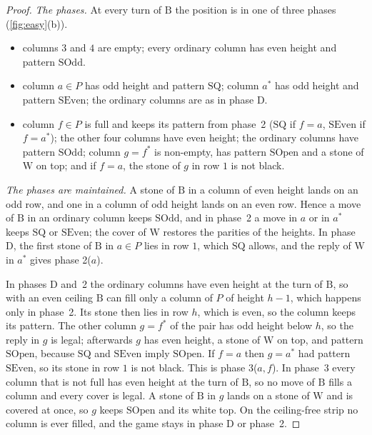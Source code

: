 \documentclass[11pt,a4paper]{article}
\theoremstyle{plain}
\theoremstyle{definition}
\newcommand{\B}{\mathrm{B}}
\newcommand{\W}{\mathrm{W}}
\begin{document}
\begin{proof}
\emph{The phases.} At every turn of $\B$ the position is in one of three phases (\cref{fig:easy}(b)).
\begin{itemize}[leftmargin=4.2em,labelwidth=3.6em,labelsep=0.6em,align=left]
  \item[D:] columns $3$ and $4$ are empty; every ordinary column has even height and pattern $\mathrm{SOdd}$.
  \item[2($a$):] column $a\in P$ has odd height and pattern $\mathrm{SQ}$; column $a^*$ has odd height and pattern $\mathrm{SEven}$; the ordinary columns are as in phase D.
  \item[3($a,f$):] column $f\in P$ is full and keeps its pattern from phase~2 ($\mathrm{SQ}$ if $f=a$, $\mathrm{SEven}$ if $f=a^*$); the other four columns have even height; the ordinary columns have pattern $\mathrm{SOdd}$; column $g=f^*$ is non-empty, has pattern $\mathrm{SOpen}$ and a stone of $\W$ on top; and if $f=a$, the stone of $g$ in row $1$ is not black.
\end{itemize}

\emph{The phases are maintained.} A stone of $\B$ in a column of even height lands on an odd row, and one in a column of odd height lands on an even row. Hence a move of $\B$ in an ordinary column keeps $\mathrm{SOdd}$, and in phase~2 a move in $a$ or in $a^*$ keeps $\mathrm{SQ}$ or $\mathrm{SEven}$; the cover of $\W$ restores the parities of the heights. In phase D, the first stone of $\B$ in $a\in P$ lies in row $1$, which $\mathrm{SQ}$ allows, and the reply of $\W$ in $a^*$ gives phase 2($a$).

In phases D and~2 the ordinary columns have even height at the turn of $\B$, so with an even ceiling $\B$ can fill only a column of $P$ of height $h-1$, which happens only in phase~2. Its stone then lies in row $h$, which is even, so the column keeps its pattern. The other column $g=f^*$ of the pair has odd height below $h$, so the reply in $g$ is legal; afterwards $g$ has even height, a stone of $\W$ on top, and pattern $\mathrm{SOpen}$, because $\mathrm{SQ}$ and $\mathrm{SEven}$ imply $\mathrm{SOpen}$. If $f=a$ then $g=a^*$ had pattern $\mathrm{SEven}$, so its stone in row $1$ is not black. This is phase 3($a,f$). In phase~3 every column that is not full has even height at the turn of $\B$, so no move of $\B$ fills a column and every cover is legal. A stone of $\B$ in $g$ lands on a stone of $\W$ and is covered at once, so $g$ keeps $\mathrm{SOpen}$ and its white top. On the ceiling-free strip no column is ever filled, and the game stays in phase D or phase~2.


\end{proof}
\end{document}
